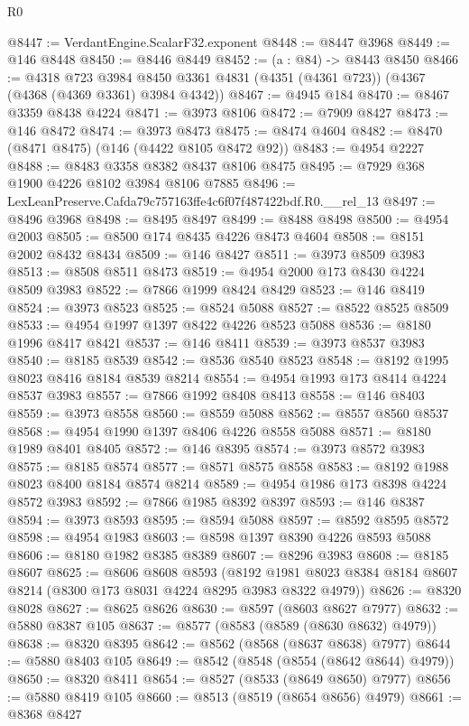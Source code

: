 \begin{lexlean}{R0}
\begin{coremodule}
@8447 := VerdantEngine.ScalarF32.exponent
@8448 := @8447 @3968
@8449 := @146 @8448
@8450 := @8446 @8449
@8452 := (a : @84) -> @8443 @8450
@8466 := @4318
    @723
    @3984
    @8450
    @3361
    @4831
    (@4351 (@4361 @723))
    (@4367 (@4368 (@4369 @3361) @3984 @4342))
@8467 := @4945 @184
@8470 := @8467 @3359 @8438 @4224
@8471 := @3973 @8106
@8472 := @7909 @8427
@8473 := @146 @8472
@8474 := @3973 @8473
@8475 := @8474 @4604
@8482 := @8470 (@8471 @8475) (@146 (@4422 @8105 @8472 @92))
@8483 := @4954 @2227
@8488 := @8483 @3358 @8382 @8437 @8106 @8475
@8495 := @7929 @368 @1900 @4226 @8102 @3984 @8106 @7885
@8496 := LexLeanPreserve.Cafda79c757163ffe4c6f07f487422bdf.R0.__rel_13
@8497 := @8496 @3968
@8498 := @8495 @8497
@8499 := @8488 @8498
@8500 := @4954 @2003
@8505 := @8500 @174 @8435 @4226 @8473 @4604
@8508 := @8151 @2002 @8432 @8434
@8509 := @146 @8427
@8511 := @3973 @8509 @3983
@8513 := @8508 @8511 @8473
@8519 := @4954 @2000 @173 @8430 @4224 @8509 @3983
@8522 := @7866 @1999 @8424 @8429
@8523 := @146 @8419
@8524 := @3973 @8523
@8525 := @8524 @5088
@8527 := @8522 @8525 @8509
@8533 := @4954 @1997 @1397 @8422 @4226 @8523 @5088
@8536 := @8180 @1996 @8417 @8421
@8537 := @146 @8411
@8539 := @3973 @8537 @3983
@8540 := @8185 @8539
@8542 := @8536 @8540 @8523
@8548 := @8192 @1995 @8023 @8416 @8184 @8539 @8214
@8554 := @4954 @1993 @173 @8414 @4224 @8537 @3983
@8557 := @7866 @1992 @8408 @8413
@8558 := @146 @8403
@8559 := @3973 @8558
@8560 := @8559 @5088
@8562 := @8557 @8560 @8537
@8568 := @4954 @1990 @1397 @8406 @4226 @8558 @5088
@8571 := @8180 @1989 @8401 @8405
@8572 := @146 @8395
@8574 := @3973 @8572 @3983
@8575 := @8185 @8574
@8577 := @8571 @8575 @8558
@8583 := @8192 @1988 @8023 @8400 @8184 @8574 @8214
@8589 := @4954 @1986 @173 @8398 @4224 @8572 @3983
@8592 := @7866 @1985 @8392 @8397
@8593 := @146 @8387
@8594 := @3973 @8593
@8595 := @8594 @5088
@8597 := @8592 @8595 @8572
@8598 := @4954 @1983
@8603 := @8598 @1397 @8390 @4226 @8593 @5088
@8606 := @8180 @1982 @8385 @8389
@8607 := @8296 @3983
@8608 := @8185 @8607
@8625 := @8606
    @8608
    @8593
    (@8192 @1981 @8023 @8384 @8184 @8607 @8214 (@8300 @173 @8031 @4224 @8295 @3983 @8322 @4979))
@8626 := @8320 @8028
@8627 := @8625 @8626
@8630 := @8597 (@8603 @8627 @7977)
@8632 := @5880 @8387 @105
@8637 := @8577 (@8583 (@8589 (@8630 @8632) @4979))
@8638 := @8320 @8395
@8642 := @8562 (@8568 (@8637 @8638) @7977)
@8644 := @5880 @8403 @105
@8649 := @8542 (@8548 (@8554 (@8642 @8644) @4979))
@8650 := @8320 @8411
@8654 := @8527 (@8533 (@8649 @8650) @7977)
@8656 := @5880 @8419 @105
@8660 := @8513 (@8519 (@8654 @8656) @4979)
@8661 := @8368 @8427

\end{coremodule}
\end{lexlean}
